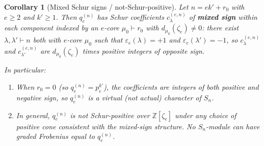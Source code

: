 \documentclass[11pt]{article}
\newtheorem{corollary}[theorem]{Corollary}
\theoremstyle{definition}
\theoremstyle{remark}
\newcommand{\qen}{q_e^{(n)}}
\newcommand{\zetae}{\zeta_e}
\newcommand{\ZZ}{\mathbb{Z}}
\begin{document}
\begin{corollary}[Mixed Schur signs / not-Schur-positive]
\label{cor:virtual}
Let $n=ek'+r_0$ with $e\ge 2$ and $k'\ge 1$. Then $\qen$ has Schur
coefficients $c_\lambda^{(e,n)}$ of \textbf{mixed sign} within each
component indexed by an $e$-core $\mu_0\vdash r_0$ with $d_{\mu_0}(\zetae)\ne 0$:
there exist $\lambda,\lambda'\vdash n$ both with $e$-core $\mu_0$ such that
$\varepsilon_e(\lambda)=+1$ and $\varepsilon_e(\lambda')=-1$, so
$c_\lambda^{(e,n)}$ and $c_{\lambda'}^{(e,n)}$ are $d_{\mu_0}(\zetae)$
times positive integers of opposite sign.

In particular:
\begin{enumerate}
\item[(i)] When $r_0=0$ (so $\qen=p_e^{k'}$), the coefficients are integers
  of both positive and negative sign, so $\qen$ is a virtual (not actual)
  character of $S_n$.
\item[(ii)] In general, $\qen$ is not Schur-positive over $\ZZ[\zetae]$
  under any choice of positive cone consistent with the mixed-sign
  structure. No $S_n$-module can have graded Frobenius equal to $\qen$.
\end{enumerate}
\end{corollary}
\end{document}
